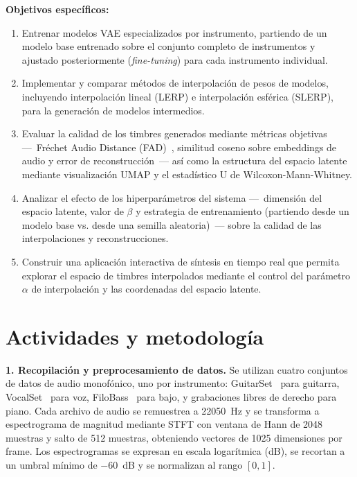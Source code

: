 \documentclass[a4paper,11pt,titlepage]{article}
\begin{document}
\textbf{Objetivos específicos:}
\begin{enumerate}
    \item Entrenar modelos VAE especializados por instrumento, partiendo de un modelo
    base entrenado sobre el conjunto completo de instrumentos y ajustado posteriormente
    (\emph{fine-tuning}) para cada instrumento individual.

    \item Implementar y comparar métodos de interpolación de pesos de modelos,
    incluyendo interpolación lineal (LERP) e interpolación esférica (SLERP),
    para la generación de modelos intermedios.

    \item Evaluar la calidad de los timbres generados mediante métricas objetivas
    ---~Fréchet Audio Distance (FAD)~\cite{gui2024adaptingfrechetaudiodistance}, similitud coseno sobre embeddings de audio
    y error de reconstrucción~--- así como la estructura del espacio latente mediante
    visualización UMAP y el estadístico U de Wilcoxon-Mann-Whitney.

    \item Analizar el efecto de los hiperparámetros del sistema ---~dimensión del
    espacio latente, valor de $\beta$ y estrategia de entrenamiento
    (partiendo desde un modelo base vs. desde una semilla aleatoria)~--- sobre la calidad de las
    interpolaciones y reconstrucciones.

    \item Construir una aplicación interactiva de síntesis en tiempo real que
    permita explorar el espacio de timbres interpolados mediante el control
    del parámetro $\alpha$ de interpolación y las coordenadas del espacio latente.
\end{enumerate}

\section*{Actividades y metodología}

\textbf{1. Recopilación y preprocesamiento de datos.}
Se utilizan cuatro conjuntos de datos de audio monofónico, uno por instrumento:
GuitarSet~\cite{xi2019guitarset} para guitarra, VocalSet~\cite{wilkins2018vocalset}
para voz, FiloBass~\cite{riley2023filobass} para bajo, y grabaciones libres de derecho para piano.
Cada archivo de audio se remuestrea a 22050~Hz y se transforma a espectrograma de
magnitud mediante STFT con ventana de Hann de 2048 muestras y salto de 512 muestras,
obteniendo vectores de 1025 dimensiones por frame. Los espectrogramas se expresan en
escala logarítmica (dB), se recortan a un umbral mínimo de $-60$~dB y se normalizan
al rango $[0, 1]$.
\end{document}
